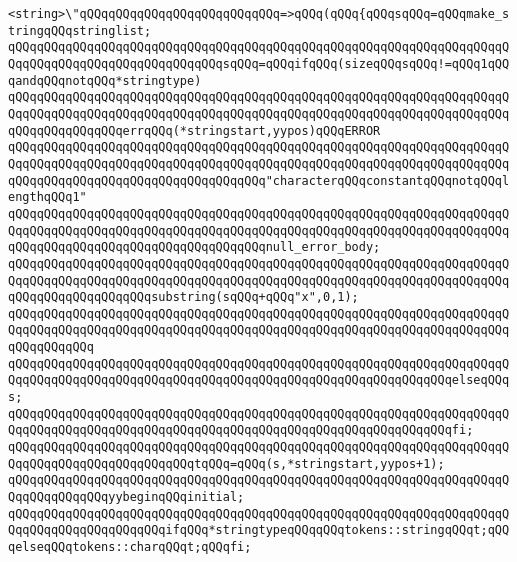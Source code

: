 \newline
\verb|<string>\"qQQqqQQqqQQqqQQqqQQqqQQqqQQq=>qQQq(qQQq{qQQqsqQQq=qQQqmake_stringqQQqstringlist;|\newline
\verb|qQQqqQQqqQQqqQQqqQQqqQQqqQQqqQQqqQQqqQQqqQQqqQQqqQQqqQQqqQQqqQQqqQQqqQQqqQQqqQQqqQQqqQQqqQQqqQQqqQQqsqQQq=qQQqifqQQq(sizeqQQqsqQQq!=qQQq1qQQqandqQQqnotqQQq*stringtype)|\newline
\verb|qQQqqQQqqQQqqQQqqQQqqQQqqQQqqQQqqQQqqQQqqQQqqQQqqQQqqQQqqQQqqQQqqQQqqQQqqQQqqQQqqQQqqQQqqQQqqQQqqQQqqQQqqQQqqQQqqQQqqQQqqQQqqQQqqQQqqQQqqQQqqQQqqQQqqQQqqQQqerrqQQq(*stringstart,yypos)qQQqERROR|\newline
\verb|qQQqqQQqqQQqqQQqqQQqqQQqqQQqqQQqqQQqqQQqqQQqqQQqqQQqqQQqqQQqqQQqqQQqqQQqqQQqqQQqqQQqqQQqqQQqqQQqqQQqqQQqqQQqqQQqqQQqqQQqqQQqqQQqqQQqqQQqqQQqqQQqqQQqqQQqqQQqqQQqqQQqqQQqqQQqqQQq"characterqQQqconstantqQQqnotqQQqlengthqQQq1"|\newline
\verb|qQQqqQQqqQQqqQQqqQQqqQQqqQQqqQQqqQQqqQQqqQQqqQQqqQQqqQQqqQQqqQQqqQQqqQQqqQQqqQQqqQQqqQQqqQQqqQQqqQQqqQQqqQQqqQQqqQQqqQQqqQQqqQQqqQQqqQQqqQQqqQQqqQQqqQQqqQQqqQQqqQQqqQQqqQQqqQQqnull_error_body;|\newline
\verb|qQQqqQQqqQQqqQQqqQQqqQQqqQQqqQQqqQQqqQQqqQQqqQQqqQQqqQQqqQQqqQQqqQQqqQQqqQQqqQQqqQQqqQQqqQQqqQQqqQQqqQQqqQQqqQQqqQQqqQQqqQQqqQQqqQQqqQQqqQQqqQQqqQQqqQQqqQQqqQQqsubstring(sqQQq+qQQq"x",0,1);|\newline
\verb|qQQqqQQqqQQqqQQqqQQqqQQqqQQqqQQqqQQqqQQqqQQqqQQqqQQqqQQqqQQqqQQqqQQqqQQqqQQqqQQqqQQqqQQqqQQqqQQqqQQqqQQqqQQqqQQqqQQqqQQqqQQqqQQqqQQqqQQqqQQqqQQqqQQqqQQq|\newline
\verb|qQQqqQQqqQQqqQQqqQQqqQQqqQQqqQQqqQQqqQQqqQQqqQQqqQQqqQQqqQQqqQQqqQQqqQQqqQQqqQQqqQQqqQQqqQQqqQQqqQQqqQQqqQQqqQQqqQQqqQQqqQQqqQQqqQQqelseqQQqs;|\newline
\verb|qQQqqQQqqQQqqQQqqQQqqQQqqQQqqQQqqQQqqQQqqQQqqQQqqQQqqQQqqQQqqQQqqQQqqQQqqQQqqQQqqQQqqQQqqQQqqQQqqQQqqQQqqQQqqQQqqQQqqQQqqQQqqQQqqQQqfi;|\newline
\verb|qQQqqQQqqQQqqQQqqQQqqQQqqQQqqQQqqQQqqQQqqQQqqQQqqQQqqQQqqQQqqQQqqQQqqQQqqQQqqQQqqQQqqQQqqQQqqQQqtqQQq=qQQq(s,*stringstart,yypos+1);|\newline
\verb|qQQqqQQqqQQqqQQqqQQqqQQqqQQqqQQqqQQqqQQqqQQqqQQqqQQqqQQqqQQqqQQqqQQqqQQqqQQqqQQqqQQqyybeginqQQqinitial;|\newline
\verb|qQQqqQQqqQQqqQQqqQQqqQQqqQQqqQQqqQQqqQQqqQQqqQQqqQQqqQQqqQQqqQQqqQQqqQQqqQQqqQQqqQQqqQQqqQQqifqQQq*stringtypeqQQqqQQqtokens::stringqQQqt;qQQqelseqQQqtokens::charqQQqt;qQQqfi;|\newline
